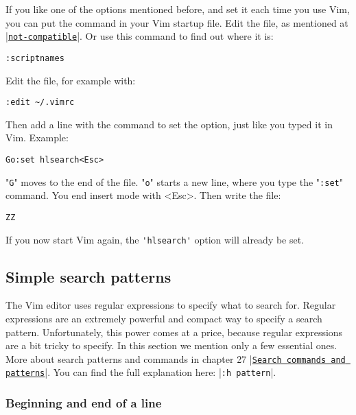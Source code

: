 If you like one of the options mentioned before, and set it each time you use Vim, you can put the command in your Vim startup file.
Edit the file, as mentioned at \hyperref[not-compatible]{|\texttt{not-compatible}|}.
Or use this command to find out where it is:

 \begin{Verbatim}[samepage=true]
 :scriptnames
 \end{Verbatim}

Edit the file, for example with:

 \begin{Verbatim}[samepage=true]
 :edit ~/.vimrc
 \end{Verbatim}

Then add a line with the command to set the option, just like you typed it in Vim.
Example:

 \begin{Verbatim}[samepage=true]
 Go:set hlsearch<Esc>
 \end{Verbatim}

"\verb!G!" moves to the end of the file.
"\verb!o!" starts a new line, where you type the "\verb!:set!" command.
You end insert mode with <Esc>.
Then write the file:

 \begin{Verbatim}[samepage=true]
 ZZ
 \end{Verbatim}

If you now start Vim again, the \verb!'hlsearch'! option will already be set.

\subsection{Simple search patterns}
\label{Simple search patterns}

The Vim editor uses regular expressions to specify what to search for.
Regular expressions are an extremely powerful and compact way to specify a search pattern.
Unfortunately, this power comes at a price, because regular expressions are a bit tricky to specify.
In this section we mention only a few essential ones.
More about search patterns and commands in chapter 27 |\hyperref[Search commands and patterns]{\texttt{Search commands and patterns}}|.
You can find the full explanation here: |\verb!:h pattern!|.

\subsubsection{Beginning and end of a line}

